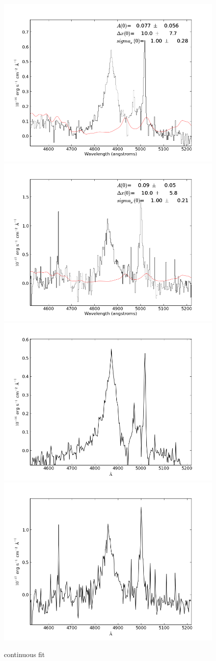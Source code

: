 \documentclass[usenatbib]{mn2e}
\begin{document}
\newpage


\begin{figure}
\begin{center}
\includegraphics[width=0.46\linewidth,angle=0]{fe_fit_Hbeta_4.png}
\vspace{5mm}
\includegraphics[width=0.49\linewidth,angle=0]{fe_fit_Hbeta_5.png}\\
\includegraphics[width=0.46\linewidth,angle=0]{fe_fit_Hbeta_res_4.png}
\hspace{5mm}
\includegraphics[width=0.49\linewidth,angle=0]{fe_fit_Hbeta_res_5.png}\\
\end{center} 
\caption{continuous fit \label{fig:landscape}}   
\end{figure}
\end{document}
